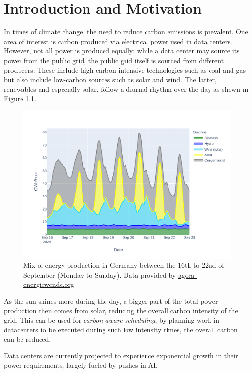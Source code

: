 \chapter{Introduction and Motivation}

In times of climate change, the need to reduce carbon emissions is prevalent. 
One area of interest is carbon produced via electrical power used in data centers. 
However, not all power is produced equally: while a data center may source its power from the public grid, the public grid itself is sourced from different producers. 
These include high-carbon intensive technologies such as coal and gas but also include low-carbon sources such as solar and wind. 
The latter, renewables and especially solar, follow a diurnal rhythm over the day as shown in Figure \ref{fig:energy_mix}.

\begin{figure}
    \includegraphics[width=\linewidth]{agorameter/energy_production_week.pdf}
    \caption[short]{Mix of energy production in Germany between the 16th to 22nd of September (Monday to Sunday). Data provided by \url{agora-energiewende.org}}
    \label{fig:energy_mix}
\end{figure}

As the sun shines more during the day, a bigger part of the total power production then comes from solar, reducing the overall carbon intensity of the grid.
This can be used for \emph{carbon aware scheduling}, by planning work in datacenters to be executed during such low intensity times, the overall carbon can be reduced.

Data centers are currently projected to experience exponential growth in their power requirements, largely fueled by pushes in AI.\cite{schwartz_green_2019}

